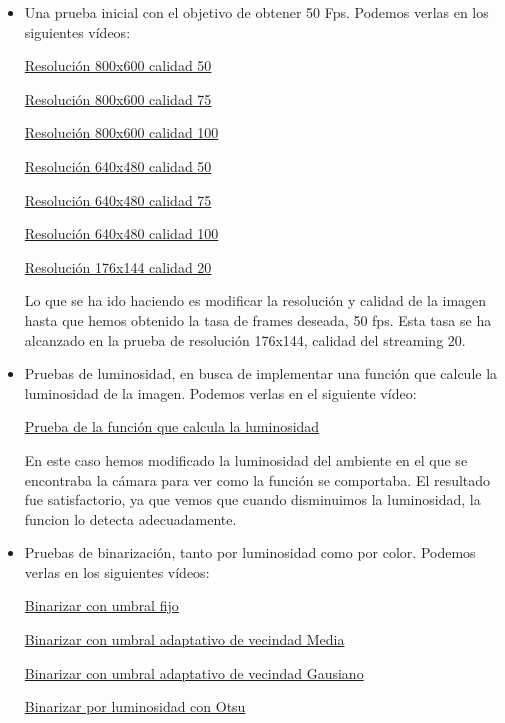\begin{itemize}
	\item Una prueba inicial con el objetivo de obtener 50 Fps. Podemos verlas en los siguientes vídeos:
	
	\href{https://youtu.be/r73s9I_8SiI}{Resolución 800x600 calidad 50}
	
	\href{https://youtu.be/rdv0COnl-G4}{Resolución 800x600 calidad 75}
	
	\href{https://youtu.be/tGip7sWjD8E}{Resolución 800x600 calidad 100}
	
	\href{https://youtu.be/saFDDQNjsEs}{Resolución 640x480 calidad 50}
	
	\href{https://youtu.be/a3ZxLQB37k0}{Resolución 640x480 calidad 75}
	
	\href{https://youtu.be/zu8rWr31fuQ}{Resolución 640x480 calidad 100}
	
	\href{https://youtu.be/WzJjXKeKpaI}{Resolución 176x144 calidad 20}	
	
	Lo que se ha ido haciendo es modificar la resolución y calidad de la imagen hasta que hemos obtenido la tasa de frames deseada, 50 fps. Esta tasa se ha alcanzado en la prueba de resolución 176x144, calidad del streaming 20.
	
	\item Pruebas de luminosidad, en busca de implementar una función que calcule la luminosidad de la imagen. Podemos verlas en el siguiente vídeo:
	
	\href{https://youtu.be/CuTADdioU4g}{Prueba de la función que calcula la luminosidad}	
	
	En este caso hemos modificado la luminosidad del ambiente en el que se encontraba la cámara para ver como la función se comportaba. El resultado fue satisfactorio, ya que vemos que cuando disminuimos la luminosidad, la funcion lo detecta adecuadamente.
	
	\item Pruebas de binarización, tanto por luminosidad como por color. Podemos verlas en los siguientes vídeos:
	
	\href{https://youtu.be/Gu_HvPr3cCU}{Binarizar con umbral fijo}
	
	\href{https://youtu.be/NCWQ2I-1J_o}{Binarizar con umbral adaptativo de vecindad Media}
	
	\href{https://youtu.be/XPxqk3kNXKY}{Binarizar con umbral adaptativo de vecindad Gausiano}
	
	\href{https://youtu.be/4CW4r9qdo4Y}{Binarizar por luminosidad con Otsu}
	

\end{itemize}
